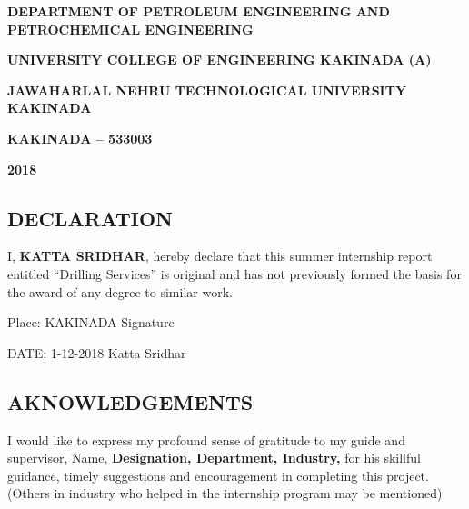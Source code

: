 \documentclass[11pt,a4paper]{article}
\begin{document}
\begin{titlepage}
\begin{center}
\vspace{1em}

\doublespacing

\large \textbf{DEPARTMENT OF PETROLEUM ENGINEERING AND \\ 
PETROCHEMICAL ENGINEERING}

\large \textbf{UNIVERSITY COLLEGE OF ENGINEERING KAKINADA (A)}

\large \textbf{JAWAHARLAL NEHRU TECHNOLOGICAL UNIVERSITY KAKINADA}

\large \textbf{KAKINADA – 533003}

\large \textbf{2018}

\end{center}
\end{titlepage}

\newpage

\begin{center}
\section*{DECLARATION}
\end{center}

\vspace{4em}


I, \textbf{KATTA SRIDHAR}, hereby declare that this summer internship report entitled “Drilling Services” is original and has not previously formed the basis for the award of any degree to similar work.


\vspace{5em}

\noindent Place: KAKINADA  \hfill Signature     \hspace{0.02\textwidth}

\vspace{1em}

\noindent DATE: 1-12-2018  \hfill Katta Sridhar


\newpage

\begin{center}
\section*{AKNOWLEDGEMENTS}
\end{center}


\vspace{1em}

I would like to express my profound sense of gratitude to my guide and supervisor, Name, \textbf{Designation, Department, Industry,} for his skillful guidance, timely suggestions and encouragement in completing this project. (Others in industry who helped in the internship program may be mentioned)
\end{document}

